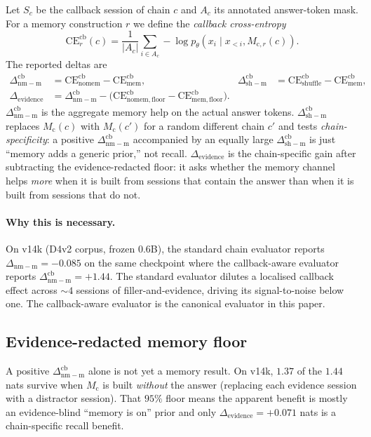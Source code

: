 \documentclass[11pt]{article}
\newcommand{\Mc}{M_{\mathrm{c}}}
\newcommand{\dnm}{\Delta_{\mathrm{nm{-}m}}}
\newcommand{\dsh}{\Delta_{\mathrm{sh{-}m}}}
\newcommand{\elift}{\Delta_{\mathrm{evidence}}}
\begin{document}
Let $S_c$ be the callback session of chain $c$ and $A_c$ its annotated
answer-token mask. For a memory construction $r$ we define the
\emph{callback cross-entropy}
\[
\mathrm{CE}_r^{\mathrm{cb}}(c) =
  \frac{1}{|A_c|} \sum_{i \in A_c} -\log p_\theta(x_i \mid x_{<i}, M_{\mathrm{c},r}(c)).
\]
The reported deltas are
\begin{align}
\dnm^{\mathrm{cb}} &= \mathrm{CE}_{\mathrm{nomem}}^{\mathrm{cb}} - \mathrm{CE}_{\mathrm{mem}}^{\mathrm{cb}},
&\dsh^{\mathrm{cb}} &= \mathrm{CE}_{\mathrm{shuffle}}^{\mathrm{cb}} - \mathrm{CE}_{\mathrm{mem}}^{\mathrm{cb}}, \\
\elift &= \dnm^{\mathrm{cb}} - \bigl(\mathrm{CE}_{\mathrm{nomem,floor}}^{\mathrm{cb}} - \mathrm{CE}_{\mathrm{mem,floor}}^{\mathrm{cb}}\bigr).
\end{align}
$\dnm^{\mathrm{cb}}$ is the aggregate memory help on the actual answer
tokens. $\dsh^{\mathrm{cb}}$ replaces $\Mc(c)$ with $\Mc(c')$ for a
random different chain $c'$ and tests \emph{chain-specificity}: a
positive $\dnm^{\mathrm{cb}}$ accompanied by an equally large
$\dsh^{\mathrm{cb}}$ is just ``memory adds a generic prior,'' not
recall.
$\elift$ is the chain-specific gain after subtracting the
evidence-redacted floor: it asks whether the memory channel helps
\emph{more} when it is built from sessions that contain the answer
than when it is built from sessions that do not.

\paragraph{Why this is necessary.}
On v14k (D4v2 corpus, frozen 0.6B), the standard chain evaluator
reports $\dnm = -0.085$ on the same checkpoint where the
callback-aware evaluator reports $\dnm^{\mathrm{cb}} = +1.44$. The
standard evaluator dilutes a localised callback effect across
$\sim 4$ sessions of filler-and-evidence, driving its signal-to-noise
below one. The callback-aware evaluator is the canonical evaluator
in this paper.

\subsection{Evidence-redacted memory floor}

A positive $\dnm^{\mathrm{cb}}$ alone is not yet a memory result.
On v14k, $1.37$ of the $1.44$ nats survive when $\Mc$ is built
\emph{without} the answer (replacing each evidence session with a
distractor session). That $95\%$ floor means the apparent benefit is
mostly an evidence-blind ``memory is on'' prior and only $\elift =
+0.071$ nats is a chain-specific recall benefit.
\end{document}
